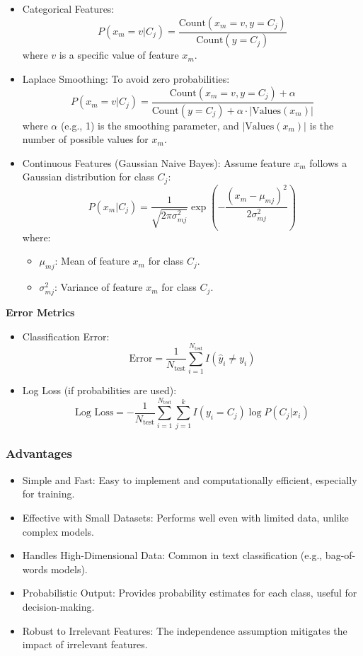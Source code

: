 \begin{itemize}
    \item Categorical Features:
        \[P(x_m = v | C_j) = \frac{\text{Count}(x_m = v, y = C_j)}{\text{Count}(y = C_j)}\]
        where $v$ is a specific value of feature $x_m$.

    \item Laplace Smoothing: To avoid zero probabilities:
        \[P(x_m = v | C_j) = \frac{\text{Count}(x_m = v, y = C_j) + \alpha}{\text{Count}(y = C_j) + \alpha \cdot |\text{Values}(x_m)|}\]
        where $\alpha$ (e.g., 1) is the smoothing parameter, and $|\text{Values}(x_m)|$ is the number of possible values for $x_m$.

    \item Continuous Features (Gaussian Naive Bayes): Assume feature $x_m$ follows a Gaussian distribution for class $C_j$:
          \[P(x_m | C_j) = \frac{1}{\sqrt{2\pi \sigma^2_{mj}}} \exp\left( -\frac{(x_m - \mu_{mj})^2}{2\sigma^2_{mj}} \right)\]
          where:
    \begin{itemize}
        \item $\mu_{mj}$: Mean of feature $x_m$ for class $C_j$.
        \item $\sigma^2_{mj}$: Variance of feature $x_m$ for class $C_j$.
    \end{itemize}
\end{itemize}

\smallskip
\textbf{Error Metrics}
\begin{itemize}
    \item Classification Error:
        \[\text{Error} = \frac{1}{N_{\text{test}}} \sum_{i=1}^{N_{\text{test}}} I(\hat{y}_i \neq y_i)\]

    \item Log Loss (if probabilities are used):
        \[\text{Log Loss} = -\frac{1}{N_{\text{test}}} \sum_{i=1}^{N_{\text{test}}} \sum_{j=1}^{k} I(y_i = C_j) \log P(C_j | x_i)\]
\end{itemize}


\subsubsection{Advantages}

\smallskip
\begin{itemize}
    \item Simple and Fast: Easy to implement and computationally efficient, especially for training.
    \item Effective with Small Datasets: Performs well even with limited data, unlike complex models.
    \item Handles High-Dimensional Data: Common in text classification (e.g., bag-of-words models).
    \item Probabilistic Output: Provides probability estimates for each class, useful for decision-making.
    \item Robust to Irrelevant Features: The independence assumption mitigates the impact of irrelevant features.
\end{itemize}

